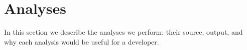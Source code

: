 \section{Analyses}

In this section we describe the analyses we perform: their source,
output, and why each analysis would be useful for a developer.








